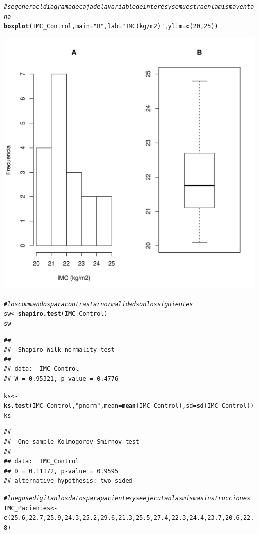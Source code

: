 \documentclass[10pt,a4paper]{article}\usepackage[]{graphicx}\usepackage[]{color}
\makeatletter
\def\maxwidth{ %
  \ifdim\Gin@nat@width>\linewidth
    \linewidth
  \else
    \Gin@nat@width
  \fi
}
\newcommand{\hlnum}[1]{\textcolor[rgb]{0.686,0.059,0.569}{#1}}%
\newcommand{\hlstr}[1]{\textcolor[rgb]{0.192,0.494,0.8}{#1}}%
\newcommand{\hlcom}[1]{\textcolor[rgb]{0.678,0.584,0.686}{\textit{#1}}}%
\newcommand{\hlstd}[1]{\textcolor[rgb]{0.345,0.345,0.345}{#1}}%
\newcommand{\hlkwb}[1]{\textcolor[rgb]{0.69,0.353,0.396}{#1}}%
\newcommand{\hlkwc}[1]{\textcolor[rgb]{0.333,0.667,0.333}{#1}}%
\newcommand{\hlkwd}[1]{\textcolor[rgb]{0.737,0.353,0.396}{\textbf{#1}}}%
\newenvironment{kframe}{%
 \def\at@end@of@kframe{}%
 \ifinner\ifhmode%
  \def\at@end@of@kframe{\end{minipage}}%
  \begin{minipage}{\columnwidth}%
 \fi\fi%
 \def\FrameCommand##1{\hskip\@totalleftmargin \hskip-\fboxsep
 \colorbox{shadecolor}{##1}\hskip-\fboxsep
     \hskip-\linewidth \hskip-\@totalleftmargin \hskip\columnwidth}%
 \MakeFramed {\advance\hsize-\width
   \@totalleftmargin\z@ \linewidth\hsize
   \@setminipage}}%
 {\par\unskip\endMakeFramed%
 \at@end@of@kframe}
\newenvironment{knitrout}{}{} %
\makeatother
\begin{document}
\begin{knitrout}
\begin{kframe}
\begin{alltt}
\hlcom{# se genera el diagrama de caja de la variable de interés y se muestra en la misma ventana}
\hlkwd{boxplot}\hlstd{(IMC_Control,}\hlkwc{main}\hlstd{=}\hlstr{"B"}\hlstd{,} \hlkwc{lab}\hlstd{=}\hlstr{"IMC (kg/m2)"}\hlstd{,}\hlkwc{ylim}\hlstd{=}\hlkwd{c}\hlstd{(}\hlnum{20}\hlstd{,}\hlnum{25}\hlstd{))}
\end{alltt}
\end{kframe}
\includegraphics[width=\maxwidth]{figure/unnamed-chunk-1-1} 
\begin{kframe}\begin{alltt}
\hlcom{# los commandos para contrastar normalidad son los siguientes}
\hlstd{sw} \hlkwb{<-} \hlkwd{shapiro.test}\hlstd{(IMC_Control)}
\hlstd{sw}
\end{alltt}
\begin{verbatim}
## 
## 	Shapiro-Wilk normality test
## 
## data:  IMC_Control
## W = 0.95321, p-value = 0.4776
\end{verbatim}
\begin{alltt}
\hlstd{ks} \hlkwb{<-} \hlkwd{ks.test}\hlstd{(IMC_Control,}\hlstr{"pnorm"}\hlstd{,}\hlkwc{mean}\hlstd{=}\hlkwd{mean}\hlstd{(IMC_Control),}\hlkwc{sd}\hlstd{=}\hlkwd{sd}\hlstd{(IMC_Control))}
\hlstd{ks}
\end{alltt}
\begin{verbatim}
## 
## 	One-sample Kolmogorov-Smirnov test
## 
## data:  IMC_Control
## D = 0.11172, p-value = 0.9595
## alternative hypothesis: two-sided
\end{verbatim}
\begin{alltt}
\hlcom{# luego se digitan los datos para pacientes y se ejecutan las mismas instrucciones}
\hlstd{IMC_Pacientes} \hlkwb{<-} \hlkwd{c}\hlstd{(}\hlnum{25.6}\hlstd{,} \hlnum{22.7}\hlstd{,} \hlnum{25.9}\hlstd{,} \hlnum{24.3}\hlstd{,} \hlnum{25.2}\hlstd{,} \hlnum{29.6}\hlstd{,} \hlnum{21.3}\hlstd{,} \hlnum{25.5}\hlstd{,} \hlnum{27.4}\hlstd{,} \hlnum{22.3}\hlstd{,} \hlnum{24.4}\hlstd{,} \hlnum{23.7}\hlstd{,} \hlnum{20.6}\hlstd{,} \hlnum{22.8}\hlstd{)}


\end{alltt}
\end{kframe}
\end{knitrout}
\end{document}
